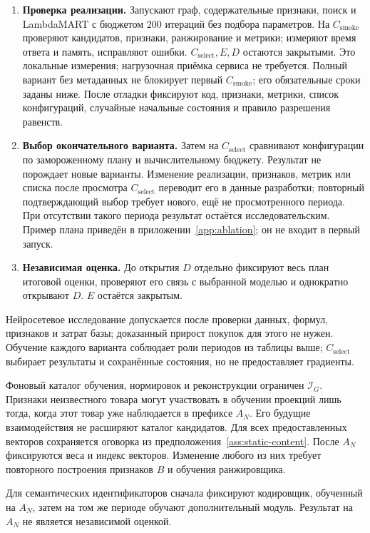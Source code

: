 \documentclass[12pt,a4paper]{article}
\theoremstyle{plainru}
\begin{document}
\begin{enumerate}[leftmargin=*]
\item \textbf{Проверка реализации.}
Запускают граф, содержательные признаки, поиск и LambdaMART
с бюджетом $200$ итераций без подбора параметров. На $C_{\mathrm{smoke}}$ проверяют кандидатов,
признаки, ранжирование и метрики; измеряют время ответа и память,
исправляют ошибки. $C_{\mathrm{select}},E,D$ остаются закрытыми.
Это локальные измерения; нагрузочная приёмка сервиса не требуется.
Полный вариант без метаданных не блокирует первый
$C_{\mathrm{smoke}}$; его обязательные сроки заданы ниже.
После отладки фиксируют код, признаки, метрики, список конфигураций,
случайные начальные состояния и правило разрешения равенств.
\item \textbf{Выбор окончательного варианта.}
Затем на $C_{\mathrm{select}}$ сравнивают конфигурации по замороженному плану
и вычислительному бюджету. Результат не порождает новые варианты.
Изменение реализации, признаков, метрик или списка после просмотра
$C_{\mathrm{select}}$ переводит его в данные разработки; повторный
подтверждающий выбор требует нового, ещё не просмотренного периода.
При отсутствии такого периода результат остаётся исследовательским.
Пример плана приведён
в приложении~\ref{app:ablation}; он не входит в первый запуск.
\item \textbf{Независимая оценка.}
До открытия $D$ отдельно фиксируют весь план итоговой оценки,
проверяют его связь с выбранной моделью и однократно открывают $D$.
$E$ остаётся закрытым.
\end{enumerate}

Нейросетевое исследование допускается после проверки данных, формул,
признаков и затрат базы; доказанный прирост покупок для этого не нужен.
Обучение каждого варианта соблюдает роли периодов из таблицы выше;
$C_{\mathrm{select}}$ выбирает результаты и сохранённые состояния,
но не предоставляет градиенты.

Фоновый каталог обучения, нормировок и реконструкции ограничен
$\mathcal I_G$. Признаки неизвестного товара могут участвовать в обучении
проекций лишь тогда, когда этот товар уже наблюдается в префиксе $A_N$.
Его будущие взаимодействия не расширяют каталог кандидатов.
Для всех предоставленных векторов сохраняется оговорка
из предположения~\ref{ass:static-content}.
После $A_N$ фиксируются веса и индекс векторов. Изменение любого
из них требует повторного построения признаков $B$ и обучения ранжировщика.

Для семантических идентификаторов сначала фиксируют кодировщик,
обученный на $A_N$, затем на том же периоде обучают дополнительный
модуль. Результат на $A_N$ не является независимой оценкой.
\end{document}
